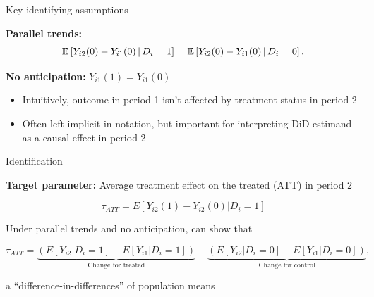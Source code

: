 \documentclass[usenames, dvipsnames, aspectratio = 169, 13pt]{beamer}
\newenvironment{wideitemize}{\itemize\addtolength{\itemsep}{10pt}}{\enditemize}
\begin{document}
\begin{frame}{Key identifying assumptions}
\begin{wideitemize}
    \item
    \textbf{Parallel trends:} 
    \begin{equation}
\mathbb{E}\left[ Y_{i2}(0) - Y_{i1}(0) \,|\, D_i = 1 \right] = \mathbb{E}\left[ Y_{i2}(0) - Y_{i1}(0) \,|\, D_i = 0 \right] . \label{eqn: pt - 2 periods}
\end{equation}


    \pause
    \item
    \textbf{No anticipation:} $Y_{i1}(1) = Y_{i1}(0)$
        \begin{itemize}
            \item 
            Intuitively, outcome in period 1 isn't affected by treatment status in period 2
            
            \item
            Often left implicit in notation, but important for interpreting DiD estimand as a causal effect in period 2
        \end{itemize}
\end{wideitemize}
\end{frame}


\begin{frame}{Identification}
\begin{wideitemize}
    \item
    \textbf{Target parameter:} Average treatment effect on the treated (ATT) in period 2
    
    $$\tau_{ATT} = E[Y_{i2}(1) - Y_{i2}(0) | D_i=1] $$
    
    \pause
    \item
    Under parallel trends and no anticipation, can show that
    
    $$\tau_{ATT} = \underbrace{(E[Y_{i2} | D_i = 1] - E[Y_{i1}| D_i =1])}_{\text{Change for treated}} - \underbrace{(E[Y_{i2} | D_i = 0] - E[Y_{i1}| D_i =0]) }_{\text{Change for control}},$$
    
    \noindent a ``difference-in-differences'' of population means
\end{wideitemize}    
\end{frame}
\end{document}
